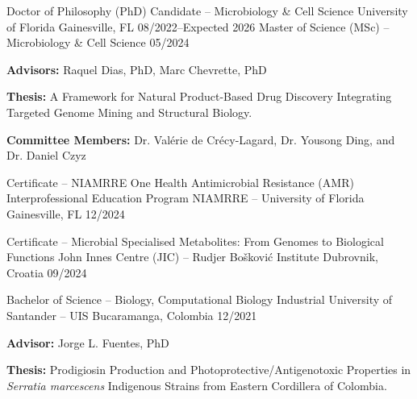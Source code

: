 {}

\begin{cventries}
\cventry
{Doctor of Philosophy (PhD) Candidate -- Microbiology \& Cell Science}
{University of Florida}
{Gainesville, FL}
{08/2022--Expected 2026}
{}
\vspace{-0.4cm}
\cventry
{Master of Science (MSc) -- Microbiology \& Cell Science}
{}
{}
{05/2024}
{
\begin{cvitems}
\item {\textbf{Advisors:} Raquel Dias, PhD, Marc Chevrette, PhD}
\item {\textbf{Thesis:} A Framework for Natural Product-Based Drug Discovery Integrating Targeted Genome Mining and Structural Biology.}
\item {\textbf{Committee Members:} Dr. Valérie de Crécy-Lagard, Dr. Yousong Ding, and Dr. Daniel Czyz}
\end{cvitems}
}

\vspace{4mm} 
\cventry
{Certificate -- NIAMRRE One Health Antimicrobial Resistance (AMR) Interprofessional Education Program}
{NIAMRRE -- University of Florida}
{Gainesville, FL}
{12/2024}
{}
\vspace{-4mm}

\cventry
{Certificate -- Microbial Specialised Metabolites: From Genomes to Biological Functions}
{John Innes Centre (JIC) – Rudjer Bošković Institute}
{Dubrovnik, Croatia}
{09/2024}
{}
\vspace{-4mm}

\cventry
{Bachelor of Science -- Biology, Computational Biology}
{Industrial University of Santander -- UIS}
{Bucaramanga, Colombia}
{12/2021} 
{
\begin{cvitems}
\item {\textbf{Advisor:} Jorge L. Fuentes, PhD}
\item {\textbf{Thesis:} Prodigiosin Production and Photoprotective/Antigenotoxic Properties in \textit{Serratia marcescens} Indigenous Strains from Eastern Cordillera of Colombia.}
\end{cvitems}
}
\vspace{-0.2 mm}
    

\end{cventries}

\vspace{3mm}
